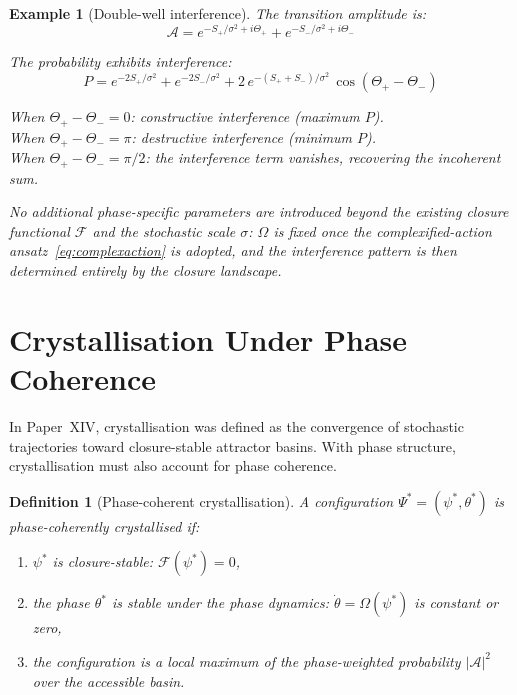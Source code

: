 \documentclass[12pt]{article}
\newtheorem{definition}[theorem]{Definition}
\newtheorem{example}[theorem]{Example}
\newcommand{\Fcal}{\mathcal{F}}
\begin{document}
\begin{example}[Double-well interference]
The transition amplitude is:
\begin{equation}
    \mathcal{A} = e^{-S_+/\sigma^2 + i\Theta_+} + e^{-S_-/\sigma^2 + i\Theta_-}
\end{equation}

The probability exhibits interference:
\begin{equation}
    P = e^{-2S_+/\sigma^2} + e^{-2S_-/\sigma^2} + 2\, e^{-(S_+ + S_-)/\sigma^2}\, \cos(\Theta_+ - \Theta_-)
\end{equation}

When $\Theta_+ - \Theta_- = 0$: constructive interference (maximum $P$).\\
When $\Theta_+ - \Theta_- = \pi$: destructive interference (minimum $P$).\\
When $\Theta_+ - \Theta_- = \pi/2$: the interference term vanishes, recovering the incoherent sum.

No additional phase-specific parameters are introduced beyond the existing closure functional $\Fcal$ and the stochastic scale $\sigma$: $\Omega$ is fixed once the complexified-action ansatz~\eqref{eq:complexaction} is adopted, and the interference pattern is then determined entirely by the closure landscape.
\end{example}

\section{Crystallisation Under Phase Coherence}\label{sec:crystal}

In Paper~XIV, crystallisation was defined as the convergence of stochastic trajectories toward closure-stable attractor basins. With phase structure, crystallisation must also account for phase coherence.

\begin{definition}[Phase-coherent crystallisation]\label{def:phasecrystal}
A configuration $\Psi^* = (\psi^*, \theta^*)$ is phase-coherently crystallised if:
\begin{enumerate}
    \item $\psi^*$ is closure-stable: $\Fcal(\psi^*) = 0$,
    \item the phase $\theta^*$ is stable under the phase dynamics: $\dot{\theta} = \Omega(\psi^*)$ is constant or zero,
    \item the configuration is a local maximum of the phase-weighted probability $|\mathcal{A}|^2$ over the accessible basin.
\end{enumerate}
\end{definition}
\end{document}
